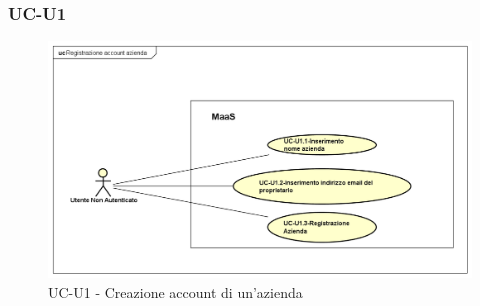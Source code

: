 \subsubsection{UC-U1}

    \begin{figure}[H]
      \begin{center}
        \includegraphics[width=12cm]{res/img/UCUtenti/UCUtenteNA/UC-U1-Creazione Account Azienda/UC-U1-CreazioneAccountAzienda}
      \caption{UC-U1 - Creazione account di un'azienda}
      \end{center} 
    \end{figure}    
    
